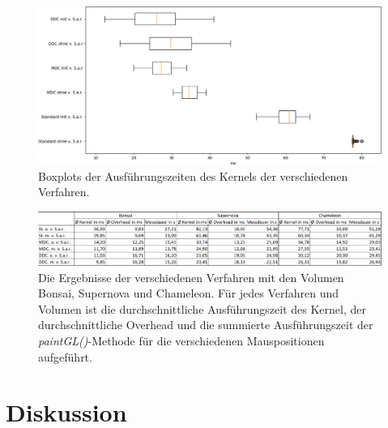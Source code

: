 \begin{figure}
	\centering
	\includegraphics[width=1\textwidth]{../../Neue_Messungen/Chameleon/boxplots.png}
	\caption{Boxplots der Ausführungszeiten des Kernels der verschiedenen Verfahren.}
	\label{fig::res::pf::bp}
\end{figure}

\begin{figure}
	\centering
	\includegraphics[width=1\textwidth]{../../Neue_Messungen/Messungen_in_Tabelle.PNG}
	\caption{Die Ergebnisse der verschiedenen Verfahren mit den Volumen Bonsai, Supernova und Chameleon. Für jedes Verfahren und Volumen ist die durchschnittliche Ausführungszeit des Kernel, der durchschnittliche Overhead und die summierte Ausführungszeit der \emph{paintGL()}-Methode für die verschiedenen Mauspositionen aufgeführt.}
	\label{fig::res::pf::table}
\end{figure}





\cleardoublepage

\section{Diskussion}\label{sec::disc}

